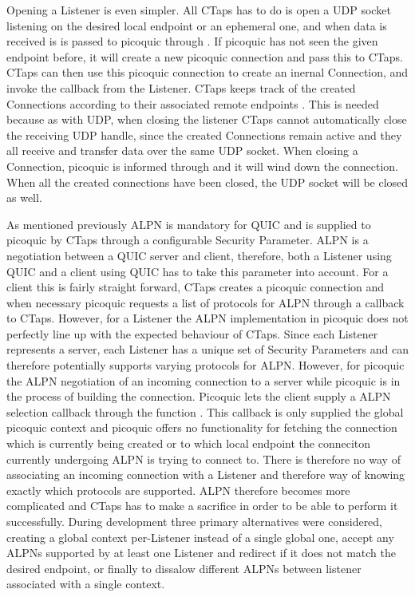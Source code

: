 Opening a Listener is even simpler. All CTaps has to do is open a UDP socket listening
on the desired local endpoint or an ephemeral one, and when data is received is is passed
to picoquic through . If picoquic has not seen the
given endpoint before, it will create a new picoquic connection and pass this to CTaps.
CTaps can then use this picoquic connection to create an inernal Connection, and invoke
the  callback from the Listener. CTaps keeps track of the created
Connections according to their associated remote endpoints .
This is
needed because as with UDP, when closing the listener CTaps cannot automatically close the
receiving UDP handle, since the created Connections remain active and they all receive and
transfer data over the same UDP socket. When closing a Connection, picoquic is informed
through  and it will wind down the connection. When all the created
connections have been closed, the UDP socket will be closed as well.

As mentioned previously ALPN is mandatory for QUIC and is supplied to picoquic
by CTaps through a configurable Security Parameter. ALPN is a negotiation
between a QUIC server and client, therefore, both a Listener using QUIC and
a client using QUIC has to take this parameter into account. For a client this
is fairly straight forward, CTaps creates a picoquic connection and when
necessary picoquic requests a list of protocols for ALPN through a callback
to CTaps. However, for a Listener the ALPN implementation in picoquic does
not perfectly line up with the expected behaviour of CTaps. Since each Listener
represents a server, each Listener has a unique set of Security Parameters and
can therefore potentially supports varying protocols for ALPN. However, for
picoquic the ALPN negotiation of an incoming connection to a server while
picoquic is in the process of building the connection. Picoquic lets the
client supply a ALPN selection callback through the function
. This callback is only supplied the
global picoquic context and picoquic offers no functionality for fetching
the connection which is currently being created or to which local endpoint
the conneciton currently undergoing ALPN is trying to connect to. There is
therefore no way of associating an incoming connection with a Listener
and therefore way of knowing exactly which protocols are supported.
ALPN therefore becomes more complicated and CTaps has to make a sacrifice
in order to be able to perform it successfully. During development three
primary alternatives were considered, creating a global context per-Listener
instead of a single global one, accept any ALPNs supported by at least one
Listener and redirect if it does not match the desired endpoint, or finally
to dissalow different ALPNs between listener associated with a single
context. 

